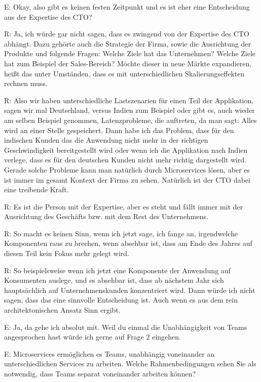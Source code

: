 E: Okay, also gibt es keinen festen Zeitpunkt und es ist eher eine Entscheidung aus der Expertise des CTO?

\label{appendix:r-12}
R: Ja, ich würde gar nicht sagen, dass es zwingend von der Expertise des CTO abhängt. Dazu gehörte auch die Strategie der Firma, sowie die Ausrichtung der Produkte und folgende Fragen: 
Welche Ziele hat das Unternehmen? Welche Ziele hat zum Beispiel der Sales-Bereich? Möchte dieser in neue Märkte expandieren, heißt das unter Umständen, dass es mit unterschiedlichen Skalierungseffekten rechnen muss.

R: Also wir haben unterschiedliche Lastszenarien für einen Teil der Applikation, sagen wir mal Deutschland, versus Indien zum Beispiel oder gibt es, auch wieder am selben Beispiel genommen, Latenzprobleme, die auftreten, da man sagt: Alles wird an einer Stelle gespeichert. Dann habe ich das Problem, dass für den indischen Kunden das die Anwendung nicht mehr in der richtigen Geschwindigkeit bereitgestellt wird oder wenn ich die Applikation nach Indien verlege, dass es für den deutschen Kunden nicht mehr richtig dargestellt wird. Gerade solche Probleme kann man natürlich durch Microservices lösen, aber es ist immer im gesamt Kontext der Firma zu sehen. Natürlich ist der CTO dabei eine treibende Kraft.

\label{appendix:r-13}
R: Es ist die Person mit der Expertise, aber es steht und fällt immer mit der Ausrichtung des Geschäfts bzw. mit dem Rest des Unternehmens.

\label{appendix:r-14}
R: So macht es keinen Sinn, wenn ich jetzt sage, ich fange an, irgendwelche Komponenten raus zu brechen, wenn absehbar ist, dass am Ende des Jahres auf diesen Teil kein Fokus mehr gelegt wird.

R: So beispielsweise wenn ich jetzt eine Komponente der Anwendung auf Konsumenten auslege, und es absehbar ist, dass ab nächstem Jahr sich hauptsächlich auf Unternehmenskunden konzentriert wird. Dann würde ich nicht sagen, dass das eine sinnvolle Entscheidung ist. Auch wenn es aus dem rein architektonischen Ansatz Sinn ergibt.

E: Ja, da gehe ich absolut mit. Weil du einmal die Unabhängigkeit von Teams angesprochen hast würde ich gerne auf Frage 2 eingehen.

E: Microservices ermöglichen es Teams, unabhängig voneinander an unterschiedlichen Services zu arbeiten. Welche Rahmenbedingungen sehen Sie als notwendig, dass Teams separat voneinander arbeiten können?

